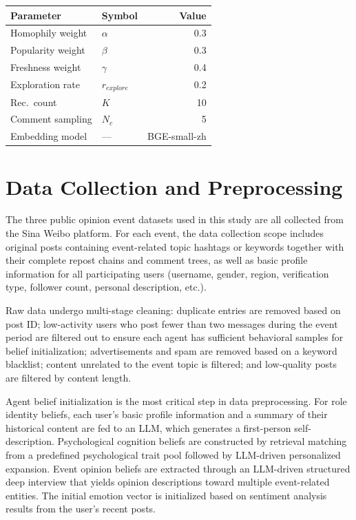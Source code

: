 \documentclass[a4paper,fleqn]{cas-dc}
\begin{document}
\vspace{12pt}

\noindent
\begin{minipage}[t]{\columnwidth}
\centering
{}
\label{tab:rec_params}
\small
\renewcommand{\arraystretch}{1.15}
\begin{tabular}{@{}llr@{}}
\toprule
\textbf{Parameter} & \textbf{Symbol} & \textbf{Value} \\
\midrule
Homophily weight & $\alpha$ & 0.3 \\
Popularity weight & $\beta$ & 0.3 \\
Freshness weight & $\gamma$ & 0.4 \\
Exploration rate & $r_{explore}$ & 0.2 \\
Rec.\ count & $K$ & 10 \\
Comment sampling & $N_c$ & 5 \\
Embedding model & --- & BGE-small-zh \\
\bottomrule
\end{tabular}
\end{minipage}

\section{Data Collection and Preprocessing}
\label{app:data}

The three public opinion event datasets used in this study are all collected from the Sina Weibo platform. For each event, the data collection scope includes original posts containing event-related topic hashtags or keywords together with their complete repost chains and comment trees, as well as basic profile information for all participating users (username, gender, region, verification type, follower count, personal description, etc.).

Raw data undergo multi-stage cleaning: duplicate entries are removed based on post ID; low-activity users who post fewer than two messages during the event period are filtered out to ensure each agent has sufficient behavioral samples for belief initialization; advertisements and spam are removed based on a keyword blacklist; content unrelated to the event topic is filtered; and low-quality posts are filtered by content length.

Agent belief initialization is the most critical step in data preprocessing. For role identity beliefs, each user's basic profile information and a summary of their historical content are fed to an LLM, which generates a first-person self-description. Psychological cognition beliefs are constructed by retrieval matching from a predefined psychological trait pool followed by LLM-driven personalized expansion. Event opinion beliefs are extracted through an LLM-driven structured deep interview that yields opinion descriptions toward multiple event-related entities. The initial emotion vector is initialized based on sentiment analysis results from the user's recent posts.
\end{document}
